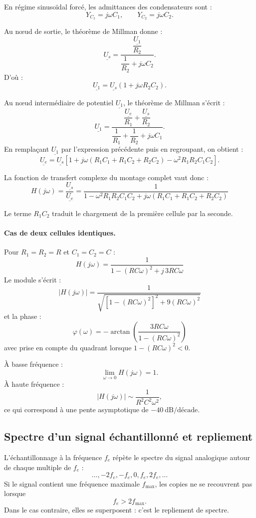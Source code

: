 En régime sinusoïdal forcé, les admittances des condensateurs sont :
\[
Y_{C_1}=j\omega C_1,
\qquad
Y_{C_2}=j\omega C_2.
\]

Au nœud de sortie, le théorème de Millman donne :
\[
\underline{U_s}
=
\frac{\dfrac{\underline{U_1}}{R_2}}
{\dfrac{1}{R_2}+j\omega C_2}.
\]
D'où :
\[
\underline{U_1}
=
\underline{U_s}\left(1+j\omega R_2C_2\right).
\]

Au nœud intermédiaire de potentiel $\underline{U_1}$, le théorème de Millman s'écrit :
\[
\underline{U_1}
=
\frac{\dfrac{\underline{U_e}}{R_1}+\dfrac{\underline{U_s}}{R_2}}
{\dfrac{1}{R_1}+\dfrac{1}{R_2}+j\omega C_1}.
\]
En remplaçant $\underline{U_1}$ par l'expression précédente puis en regroupant, on obtient :
\[
\underline{U_e}
=
\underline{U_s}
\left[
1+j\omega\left(R_1C_1+R_1C_2+R_2C_2\right)
-\omega^2R_1R_2C_1C_2
\right].
\]

La fonction de transfert complexe du montage complet vaut donc :
\[
\boxed{
H(j\omega)
=
\frac{\underline{U_s}}{\underline{U_e}}
=
\frac{1}
{1-\omega^2R_1R_2C_1C_2
+j\omega\left(R_1C_1+R_1C_2+R_2C_2\right)}
}
\]

Le terme $R_1C_2$ traduit le chargement de la première cellule par la seconde.

\paragraph{Cas de deux cellules identiques.}
Pour $R_1=R_2=R$ et $C_1=C_2=C$ :
\[
\boxed{
H(j\omega)
=
\frac{1}{1-(RC\omega)^2+j\,3RC\omega}
}
\]
Le module s'écrit :
\[
\boxed{
\left|H(j\omega)\right|
=
\frac{1}
{\sqrt{\left[1-(RC\omega)^2\right]^2+9(RC\omega)^2}}
}
\]
et la phase :
\[
\boxed{
\varphi(\omega)
=-\arctan\!\left(
\frac{3RC\omega}{1-(RC\omega)^2}
\right)
}
\]
avec prise en compte du quadrant lorsque $1-(RC\omega)^2<0$.

À basse fréquence :
\[
\lim_{\omega\to 0}H(j\omega)=1.
\]
À haute fréquence :
\[
\left|H(j\omega)\right|
\sim
\frac{1}{R^2C^2\omega^2},
\]
ce qui correspond à une pente asymptotique de $-40\ \mathrm{dB/décade}$.

\subsection{Spectre d'un signal échantillonné et repliement}\label{sec:elec-repliement-spectre}

L'échantillonnage à la fréquence $f_e$ répète le spectre du signal analogique autour de chaque multiple de $f_e$ :
\[
\ldots,-2f_e,-f_e,0,f_e,2f_e,\ldots
\]
Si le signal contient une fréquence maximale $f_{\max}$, les copies ne se recouvrent pas lorsque
\[
f_e>2f_{\max}.
\]
Dans le cas contraire, elles se superposent : c'est le repliement de spectre.

